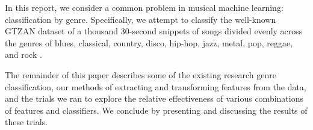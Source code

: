 In this report, we consider a common problem in musical machine learning: classification by genre. Specifically, we attempt to classify the well-known GTZAN dataset of a thousand 30-second snippets of songs divided evenly across the genres of blues, classical, country, disco, hip-hop, jazz, metal, pop, reggae, and rock \cite{GTZAN}.

The remainder of this paper describes some of the existing research genre classification, our methods of extracting and transforming features from the data, and the trials we ran to explore the relative effectiveness of various combinations of features and classifiers. We conclude by presenting and discussing the results of these trials.